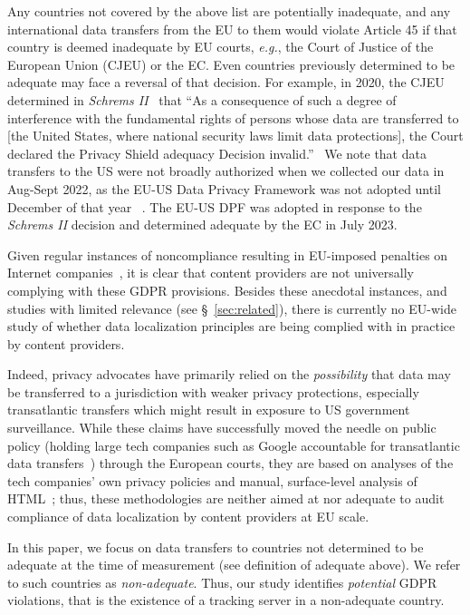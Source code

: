 Any countries not covered by the above list are potentially inadequate, 
and any international data transfers from the EU to them would violate Article 
45 if that country is deemed inadequate by EU courts, 
\textit{e.g.}, the Court of Justice of the European Union (CJEU) or the EC. 
Even countries previously determined to be adequate may face a reversal of that decision. 
For example, in 2020, the CJEU determined in \textit{Schrems II}~\cite{schremsii}  
that ``As a consequence of such a degree of interference with the fundamental rights of persons whose
data are transferred to [the United States, where national security 
laws limit data protections], the Court declared the Privacy Shield adequacy
Decision invalid.''~\cite{edpb2}
We note that data transfers to the US were not broadly authorized when we collected our data in Aug-Sept 2022,
as the EU-US Data Privacy Framework was not adopted until December of that year ~\cite{EUUSData30:online}.
The EU-US DPF was adopted in response to the \textit{Schrems II} decision and determined adequate by the EC in July 2023.~\cite{ecreport}


Given regular instances of noncompliance resulting in EU-imposed penalties on Internet 
companies~\cite{Asitsdat63:online,30Bigges7:online}, 
it is clear that content providers are not universally
complying with these GDPR provisions. 
Besides these anecdotal instances, 
and studies with limited relevance (see
\S~\ref{sec:related}), 
there is currently no EU-wide study of whether data localization 
principles are being complied with in practice by content providers. 

Indeed, privacy advocates have primarily relied on the \textit{possibility} 
that data may be transferred to a jurisdiction with weaker privacy protections, 
especially transatlantic transfers which might result in exposure to US government surveillance. 
While these claims have successfully 
moved the needle on public policy (holding large tech companies such as Google accountable for transatlantic
data transfers~\cite{DSBAustr4:online}) through the European courts, 
they are based on analyses of the tech companies' 
own privacy policies and manual, surface-level analysis of HTML~\cite{101Compl42:online}; 
thus, these methodologies are neither aimed at nor adequate to audit compliance of 
data localization by content providers at EU scale. 

In this paper, we focus on data transfers to countries not 
determined to be adequate at the time of measurement (see definition of adequate above). 
We refer to such countries as \emph{non-adequate}.
Thus, our study identifies \textit{potential} GDPR violations, that is the existence of a tracking server in a non-adequate country.





